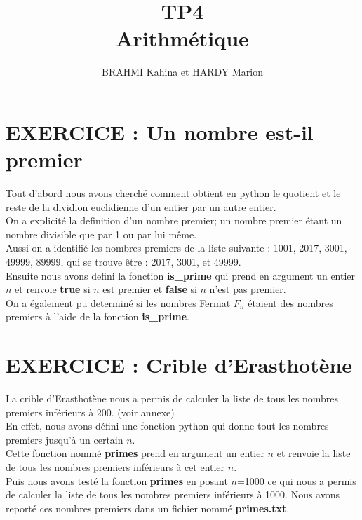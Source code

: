 \documentclass{article}
\title{TP4\\ Arithmétique}
\author{BRAHMI Kahina et HARDY Marion}
\begin{document}
\maketitle


\section{EXERCICE : Un nombre est-il premier}

	Tout d'abord nous avons cherché comment obtient en python le quotient et le reste de la dividion euclidienne d'un entier par un autre entier. 
\\

On a explicité la definition d'un nombre premier; un nombre premier étant un nombre divisible que par 1 ou par lui même.
\\

Aussi on a identifié les nombres premiers de la liste suivante : 1001, 2017, 3001, 49999, 89999, qui se trouve être : 2017, 3001, et 49999.
\\

Ensuite nous avons defini la fonction \textbf{ is\_prime} qui prend en argument un entier $n$ et renvoie {\bf true} si $n$ est premier et {\bf false} si $n$ n'est pas premier.\\
On a également pu determiné si les nombres Fermat $F_{n}$ étaient des nombres premiers à l'aide de la fonction \textbf{ is\_prime}.


\section{EXERCICE : Crible d'Erasthotène}

La crible d'Erasthotène nous a permis de calculer la liste de tous les nombres premiers inférieurs à 200. (voir annexe)
\\

En effet, nous avons défini une fonction python qui donne tout les nombres premiers jusqu'à un certain $n$.\\
Cette fonction nommé {\bf primes} prend en argument un entier $n$ et renvoie la liste de tous les nombres premiers inférieurs à cet entier $n$.
\\

Puis nous avons testé la fonction {\bf primes} en posant $n$=1000 ce qui nous a permis de calculer la liste de tous les nombres premiers inférieurs à 1000. Nous avons reporté ces nombres premiers dans un fichier nommé {\bf primes.txt}.
\\
\end{document}
